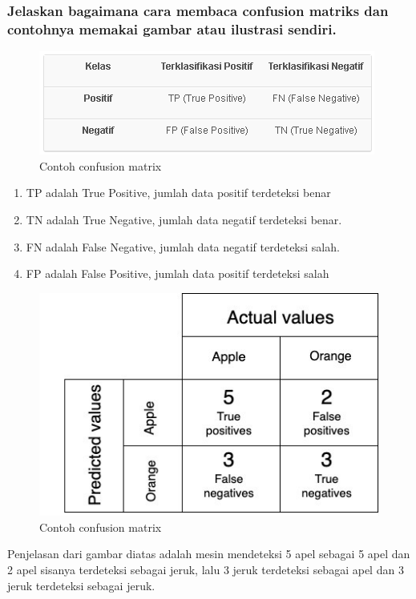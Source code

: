 \subsubsection{Jelaskan bagaimana cara membaca confusion matriks dan contohnya memakai gambar atau ilustrasi sendiri.}
\begin{figure}[H]
	\centering
	\includegraphics{figures/1174079/3/carabacaconfusionmatrix.PNG}
	\caption{Contoh confusion matrix}
\end{figure}
\begin{enumerate}
\item TP adalah True Positive, jumlah data positif terdeteksi benar 
\item TN adalah True Negative,  jumlah data negatif terdeteksi benar.
\item FN adalah False Negative,  jumlah data negatif terdeteksi salah.
\item FP adalah False Positive,  jumlah data positif terdeteksi salah 
\end{enumerate}
\begin{figure}[H]
	\centering
	\includegraphics{figures/1174079/3/contohconfusionmatrix.jpeg}
	\caption{Contoh confusion matrix}
\end{figure}
Penjelasan dari gambar diatas adalah mesin mendeteksi 5 apel sebagai 5 apel dan 2 apel sisanya terdeteksi sebagai jeruk, lalu 3 jeruk terdeteksi sebagai apel dan 3 jeruk terdeteksi sebagai jeruk.


